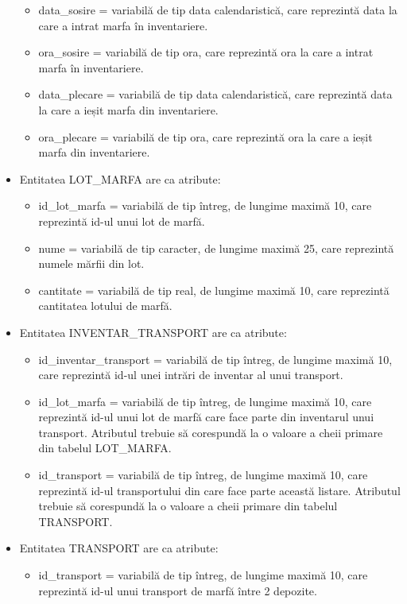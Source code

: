 \documentclass[12pt, a4paper]{article}
\begin{document}
\begin{itemize}
\begin{itemize}
            \item data\_sosire = variabilă de tip data calendaristică, care reprezintă data la care a intrat marfa în inventariere.
            \item ora\_sosire = variabilă de tip ora, care reprezintă ora la care a intrat marfa în inventariere.
            \item data\_plecare = variabilă de tip data calendaristică, care reprezintă data la care a ieșit marfa din inventariere.
            \item ora\_plecare = variabilă de tip ora, care reprezintă ora la care a ieșit marfa din inventariere.
        \end{itemize}
    \item Entitatea LOT\_MARFA are ca atribute:
        \begin{itemize}
            \item id\_lot\_marfa = variabilă de tip întreg, de lungime maximă 10, care reprezintă id-ul unui lot de marfă.
            \item nume = variabilă de tip caracter, de lungime maximă 25, care reprezintă numele mărfii din lot.
            \item cantitate = variabilă de tip real, de lungime maximă 10, care reprezintă cantitatea lotului de marfă.
        \end{itemize}
    \item Entitatea INVENTAR\_TRANSPORT are ca atribute:
        \begin{itemize}
            \item id\_inventar\_transport = variabilă de tip întreg, de lungime maximă 10, care reprezintă id-ul unei intrări de inventar al unui transport.
            \item id\_lot\_marfa = variabilă de tip întreg, de lungime maximă 10, care reprezintă id-ul unui lot de marfă care face parte din inventarul unui transport. Atributul trebuie să corespundă la o valoare a cheii primare din tabelul LOT\_MARFA.
            \item id\_transport = variabilă de tip întreg, de lungime maximă 10, care reprezintă id-ul transportului din care face parte această listare. Atributul trebuie să corespundă la o valoare a cheii primare din tabelul TRANSPORT.
        \end{itemize}
    \item Entitatea TRANSPORT are ca atribute:
        \begin{itemize}
            \item id\_transport = variabilă de tip întreg, de lungime maximă 10, care reprezintă id-ul unui transport de marfă între 2 depozite.

\end{itemize}
\end{itemize}
\end{document}
